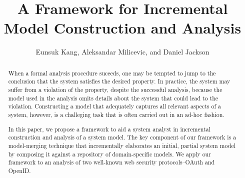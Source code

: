 \documentclass{llncs}
\begin{document}
\title{A Framework for Incremental Model Construction and Analysis}
%
%
\author{Eunsuk Kang, Aleksandar Milicevic, and Daniel Jackson}
%

\maketitle              %

\begin{abstract}
  When a formal analysis procedure suceeds, one may be tempted to jump to
  the conclusion that the system satisfies the desired property. In
  practice, the system may suffer from a violation of the property,
  despite the successful analysis, because the model used in the
  analysis omits details about the system that could lead to the
  violation. Constructing a model that adequately captures all
  relevant aspects of a system, however, is a challeging task that is
  often carried out in an ad-hoc fashion.

  In this paper, we propose a framework to aid a system analyst in
  incremental construction and analysis of a system model. The key
  component of our framework is a model-merging technique that
  incrementally elaborates an initial, partial system model by
  composing it against a repository of domain-specific models. We
  apply our framework to an analysis of two well-known web security
  protocols--OAuth and OpenID.
\end{abstract}










%
%
%

\end{document}
